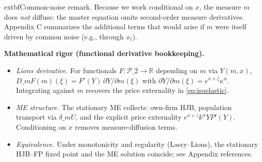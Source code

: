 \documentclass[11pt,letterpaper,oneside]{article}
\numberwithin{equation}{section}
\newcommand{\ac}[1]{{\mdseries\textsc{#1}}}
\newcommand{\R}{\mathbb{R}}
\newcommand{\1}{\mathbf{1}}
\newcommand{\dmU}{\delta\_m U}
\newcommand{\Dm}{D\_m}
\begin{document}
\begin{comment}
\begin{theorem}[Equivalence (sketch)]\label{thm:equivalence}
Under \Cref{ass:primitives,ass:regularity} and standard monotonicity/regularity hypotheses (Lasry--Lions), stationary solutions of the coupled \ac{HJB}--\ac{FP} fixed point coincide with stationary solutions of \eqref{eq:ME} conditional on $x$.
\end{theorem}

\begin{tcolorbox}[literaturestyle]
\textbf{Equivalence and uniqueness.} The Lasry--Lions monotonicity condition (here satisfied by the strictly decreasing inverse demand) ensures uniqueness of the mean-field equilibrium and therefore identification between $(V,m)$ solving \ac{HJB}--\ac{FP} and $U$ solving \ac{ME}. See Lasry \& Lions (2007) for the PDE case and Cardaliaguet--Delarue--Lasry--Lions (2019) for master equations and convergence of finite-$N$ games.
\end{tcolorbox}
\end{comment}

\begin{tcolorbox}[didacticstyle]
	extbf{Common-noise remark.} Because we work conditional on $x$, the measure $m$ does \emph{not} diffuse: the master equation omits second-order measure derivatives. Appendix C summarizes the additional terms that would arise if $m$ were itself driven by common noise (e.g., through $x_t$).
\end{tcolorbox}

\begin{tcolorbox}[mathstyle]
\textbf{Mathematical rigor (functional derivative bookkeeping).}
\begin{itemize}[leftmargin=1.15em,itemsep=0.25em]
  \item \emph{Lions derivative.} For functionals $F: \mathcal P\_2\to\R$ depending on $m$ via $Y(m,x)$, $\Dm F(m)(\xi)=F'(Y)\,\partial Y/\partial m(\xi)$ with $\partial Y/\partial m(\xi)=e^{x+\zeta}\kappa^{\alpha}$. Integrating against $m$ recovers the price externality in \eqref{eq:isoelastic}.
  \item \emph{ME structure.} The stationary ME collects: own-firm HJB, population transport via $\dmU$, and the explicit price externality $e^{x+z}k^\alpha Y P'(Y)$. Conditioning on $x$ removes measure-diffusion terms.
  \item \emph{Equivalence.} Under monotonicity and regularity (Lasry--Lions), the stationary HJB--FP fixed point and the ME solution coincide; see Appendix references.
\end{itemize}
\end{tcolorbox}
\end{document}

